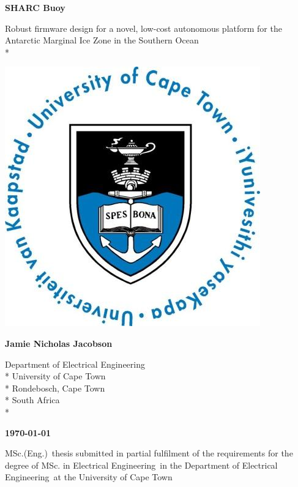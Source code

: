 \documentclass[a4paper, 12pt, oneside, openright, parskip=full]{book}
\newcommand{\auth}{Jamie Nicholas Jacobson}								%
\newcommand{\titl}{SHARC Buoy}						%
\newcommand{\subtitle}{Robust firmware design for a novel, low-cost autonomous platform for the Antarctic Marginal Ice Zone in the Southern Ocean}%
\newcommand{\dept}{Department of Electrical Engineering}%
\newcommand{\uni}{University of Cape Town}				%
\newcommand{\city}{Rondebosch, Cape Town}				%
\newcommand{\country}{South Africa}						%
\newcommand{\degre}{MSc. in Electrical Engineering}		%
\newcommand{\degreeabv}{MSc.(Eng.)}						%
\newcommand{\supervisor}{R.A. Verrinder}				%
\newcommand{\logo}										%
{	
	\includegraphics[scale = 0.3]{figs/uctLogo}
}
\begin{document}
\begin{titlepage}
	\centering
	\vspace*{1cm}
	\begin{Huge}					
		\bfseries\titl\par
		\vskip 5mm
	\end{Huge}
	\begin{Large}					
		\subtitle\\*
		\vskip 1cm
	\end{Large}
	\logo							
	\vskip 1cm	
	\begin{Large}					
		\bfseries\auth\\
	\end{Large}
	\begin{normalsize}				
		\vskip 2mm	
		\dept\\*
		\uni\\*
		\city\\*
		\country\\*
		
		\vskip 10mm	
	\end{normalsize}
	\begin{Large}					
		{\bfseries \mydate\today}
		\vskip 5mm	
	\end{Large}
		\degreeabv\ thesis submitted in partial fulfilment of the requirements for the degree of \degre\ in the \dept\ at the \uni
		

\end{titlepage}
\end{document}
